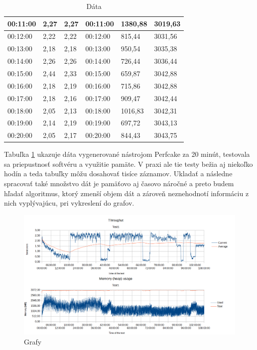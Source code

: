 \begin{table}[htb]
\begin{tabular}{|l|l|l|l|l|l|}
00:11:00      & 2,27             & 2,27             & 00:11:00      & 1380,88       & 3019,63        \\ \hline
00:12:00      & 2,22             & 2,22             & 00:12:00      & 815,44        & 3031,56        \\ \hline
00:13:00      & 2,18             & 2,18             & 00:13:00      & 950,54        & 3035,38        \\ \hline
00:14:00      & 2,26             & 2,26             & 00:14:00      & 726,44        & 3036,44        \\ \hline
00:15:00      & 2,44             & 2,33             & 00:15:00      & 659,87        & 3042,88        \\ \hline
00:16:00      & 2,18             & 2,19             & 00:16:00      & 715,86        & 3042,88        \\ \hline
00:17:00      & 2,18             & 2,16             & 00:17:00      & 909,47        & 3042,44        \\ \hline
00:18:00      & 2,05             & 2,13             & 00:18:00      & 1016,83       & 3042,31        \\ \hline
00:19:00      & 2,14             & 2,19             & 00:19:00      & 697,72        & 3043,13        \\ \hline
00:20:00      & 2,05             & 2,17             & 00:20:00      & 844,43        & 3043,75        \\ \hline
\end{tabular}
\caption{Dáta}\label{tab:Data}
\end{table}

Tabuľka  \ref{tab:Data} ukazuje dáta vygenerované nástrojom Perfcake za 20 minút, testovala sa priepustnosť softvéru a využitie pamäte. V praxi ale tie testy bežia aj niekoľko hodín a teda tabuľky môžu dosahovať tisíce záznamov. Ukladať a následne spracovať také množstvo dát je pamäťovo aj časovo náročné a preto budem hľadať algoritmus, ktorý zmenší objem dát a zároveň neznehodnotí informáciu z nich vyplývajúcu, pri vykreslení do grafov.

\begin{figure}[!ht]
\centering
\includegraphics[scale=0.70, angle =90]{graphs.png}
\caption{Grafy}\label{grafy}
\end{figure}

